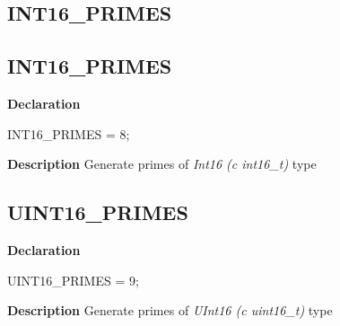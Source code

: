 \documentclass{report}
\newif\ifpdf
\begin{document}
\subsection*{\large{\textbf{INT16{\_}PRIMES}}\normalsize\hspace{1ex}\hrulefill}
\else
\subsection*{INT16{\_}PRIMES}
\fi
\label{primesieve-INT16_PRIMES}
\begin{list}{}{
\setlength{\itemindent}{0cm}
\setlength{\listparindent}{0cm}
\setlength{\leftmargin}{\evensidemargin}
\addtolength{\leftmargin}{\tmplength}
\settowidth{\labelsep}{X}
\addtolength{\leftmargin}{\labelsep}
\setlength{\labelwidth}{\tmplength}
}
\item[\textbf{Declaration}\hfill]
\ifpdf
\begin{flushleft}
\fi
\begin{ttfamily}
INT16{\_}PRIMES = 8;\end{ttfamily}

\ifpdf
\end{flushleft}
\fi

\par
\item[\textbf{Description}]
Generate primes of \textit{Int16 (c int16{\_}t)} type

\end{list}
\ifpdf
\subsection*{\large{\textbf{UINT16{\_}PRIMES}}\normalsize\hspace{1ex}\hrulefill}
\else
\subsection*{UINT16{\_}PRIMES}
\fi
\label{primesieve-UINT16_PRIMES}
\begin{list}{}{
\setlength{\itemindent}{0cm}
\setlength{\listparindent}{0cm}
\setlength{\leftmargin}{\evensidemargin}
\addtolength{\leftmargin}{\tmplength}
\settowidth{\labelsep}{X}
\addtolength{\leftmargin}{\labelsep}
\setlength{\labelwidth}{\tmplength}
}
\item[\textbf{Declaration}\hfill]
\ifpdf
\begin{flushleft}
\fi
\begin{ttfamily}
UINT16{\_}PRIMES = 9;\end{ttfamily}

\ifpdf
\end{flushleft}
\fi

\par
\item[\textbf{Description}]
Generate primes of \textit{UInt16 (c uint16{\_}t)} type

\end{list}
\ifpdf
\end{document}

